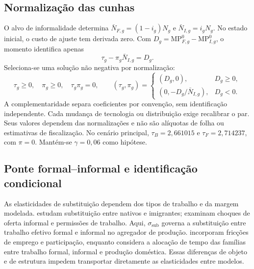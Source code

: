 \subsection{Normalização das cunhas}
O alvo de informalidade determina $\bar N_{F,g}=(1-i_g)N_g$ e $\bar N_{I,g}=i_gN_g$. No estado inicial, o custo de ajuste tem derivada zero. Com $D_g=\mathrm{MP}_{F,g}^0-\mathrm{MP}_{I,g}^0$, o momento identifica apenas
\begin{equation}\label{eq:app_wedge_identification}
\tau_g-\pi_g\bar N_{I,g}=D_g.
\end{equation}
Seleciona-se uma solução não negativa por normalização:
\begin{equation}\label{eq:app_wedge_normalization}
\tau_g\geq0,\quad\pi_g\geq0,\quad\tau_g\pi_g=0,\qquad
(\tau_g,\pi_g)=\begin{cases}(D_g,0),&D_g\geq0,\\(0,-D_g/\bar N_{I,g}),&D_g<0.\end{cases}
\end{equation}
A complementaridade separa coeficientes por convenção, sem identificação independente. Cada mudança de tecnologia ou distribuição exige recalibrar o par. Seus valores dependem das normalizações e não são alíquotas de folha ou estimativas de fiscalização. No cenário principal, $\tau_B=2{,}661015$ e $\tau_F=2{,}714237$, com $\pi=0$. Mantém-se $\gamma=0{,}06$ como hipótese.

\subsection{Ponte formal--informal e identificação condicional}\label{app:sigma_discussion}
As elasticidades de substituição dependem dos tipos de trabalho e da margem modelada. \citet{OttavianoPeri2012} estudam substituição entre nativos e imigrantes; \citet{BaharDiTellaGulek2025} examinam choques de oferta informal e permissões de trabalho. Aqui, $\sigma_{\mathrm{sub}}$ governa a substituição entre trabalho efetivo formal e informal no agregador de produção. \citet{LeyvaUrrutia2020} incorporam fricções de emprego e participação, enquanto \citet{McKiernan2021} considera a alocação de tempo das famílias entre trabalho formal, informal e produção doméstica. Essas diferenças de objeto e de estrutura impedem transportar diretamente as elasticidades entre modelos.

